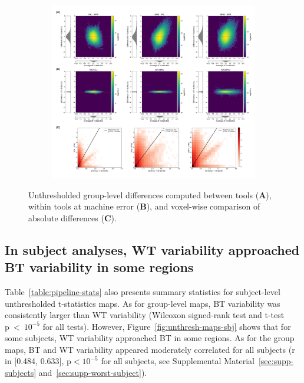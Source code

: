 \documentclass[11pt,onecolumn]{article}
\begin{document}
\begin{figure}[ht]
  \centering
  \begin{subfigure}[ht]{.9\textwidth}
    \centering
    \includegraphics[width=.9\textwidth]{figures/gl-unthresh.png}
  \end{subfigure}
  \caption{Unthresholded group-level differences computed between tools
    (\textbf{A}), within tools at machine error (\textbf{B}),
    and voxel-wise comparison of absolute differences (\textbf{C}). }
  \label{fig:unthresh-maps}
\end{figure}


\subsection{In subject analyses, WT variability approached BT variability in some regions}

Table~\ref{table:pipeline-stats} also presents summary statistics for
subject-level unthresholded t-statistics maps. As for group-level maps,
BT variability was consistently larger than WT variability (Wilcoxon
signed-rank test and t-test p~\textless~$10^{-5}$ for all tests).
However, Figure~\ref{fig:unthresh-maps-sbj} shows that for
some subjects, WT variability approached %
BT in some regions. As for the group maps, BT and WT
variability appeared moderately correlated for all subjects (r in [0.484,
    0.633], p$< 10^{-5}$ for all subjects, see Supplemental Material~\ref{sec:supp-subjects} and~\ref{sec:supp-worst-subject}).
\end{document}
